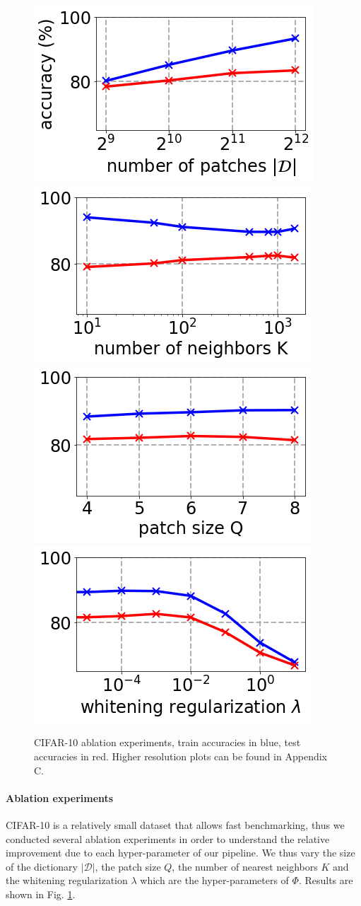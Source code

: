 \documentclass{article} %
\newcommand{\Edouard}[1]{\textcolor{blue}{#1}}
\begin{document}
\begin{figure} 
    \centering
    \includegraphics[width=0.245\linewidth]{figures/ablation_npatches.png}
    \includegraphics[width=0.245\linewidth]{figures/ablation_K.png}
    \includegraphics[width=0.245\linewidth]{figures/ablation_Q.png}
    \includegraphics[width=0.245\linewidth]{figures/ablation_lambda.png}\\
    \caption{
        CIFAR-10 ablation experiments, train accuracies in blue, test accuracies in red. Higher resolution plots can be found in  Appendix C.}
    \label{fig:ablation_study}
\end{figure}

\paragraph{Ablation experiments}
CIFAR-10 is a relatively small dataset that allows fast benchmarking, thus we conducted several ablation experiments in order to understand the relative improvement due to each hyper-parameter of our pipeline. We thus vary the size of the dictionary $|\mathcal{D}|$, the patch size $Q$, the number of nearest neighbors $K$ and the whitening regularization $\lambda$ which are the hyper-parameters of $\Phi$. Results are shown in Fig. \ref{fig:ablation_study}.


\end{document}
